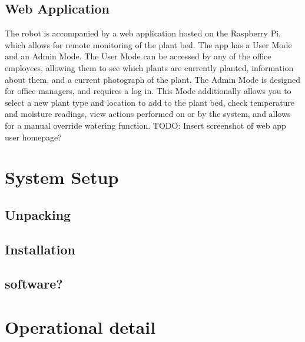 \documentclass{article}
\begin{document}
\subsection{Web Application}
The robot is accompanied by a web application hosted on the Raspberry Pi, which allows for remote monitoring of the plant bed. The app has a User Mode and an Admin Mode. The User Mode can be accessed by any of the office employees, allowing them to see which plants are currently planted, information about them, and a current photograph of the plant. The Admin Mode is designed for office managers, and requires a log in. This Mode additionally allows you to select a new plant type and location to add to the plant bed, check temperature and moisture readings, view actions performed on or by the system, and allows for a manual override watering function.
TODO: Insert screenshot of web app user homepage?

\section{System Setup}\label{sec:setup}
\subsection{Unpacking}

\subsection{Installation}

\subsection{software?}


\section{Operational detail}\label{sec:detail}
\end{document}
